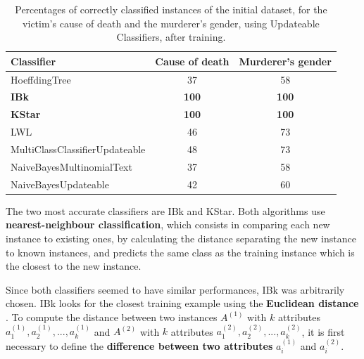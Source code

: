 \documentclass{mproj}
\begin{document}
\begin{table}[h]
	\centering
	\caption{Percentages of correctly classified instances of the initial dataset, for the victim's cause of death and the murderer's gender, using Updateable Classifiers, after training.}
	\begin{tabular}{ |l|c|c| }
		\hline
		\textbf{Classifier}            & \textbf{Cause of death} 					 & \textbf{Murderer's gender} 					  \\
		\hline		
		HoeffdingTree                  & 37                                          & 58                                             \\
		\textbf{IBk}                   & \textbf{100}                                & \textbf{100}                                   \\
		\textbf{KStar}                 & \textbf{100}                                & \textbf{100}                                   \\
		LWL                            & 46                                          & 73                                             \\
		MultiClassClassifierUpdateable & 48                                          & 73                                             \\
		NaiveBayesMultinomialText      & 37                                          & 58                                             \\
		NaiveBayesUpdateable           & 42                                          & 60                                             \\
		\hline
	\end{tabular}
	\label{tab:updateable}
\end{table}

The two most accurate classifiers are IBk and KStar. Both algorithms use \textbf{nearest-neighbour classification}, which consists in comparing each new instance to existing ones, by calculating the distance separating the new instance to known instances, and predicts the same class as the training instance which is the closest to the new instance. \cite[Chapter~3]{wekabook} \par 

Since both classifiers seemed to have similar performances, IBk was arbitrarily chosen. IBk looks for the closest training example using the \textbf{Euclidean distance} \cite[Chapter~11]{wekabook}. To compute the distance between two instances $A^{(1)}$ with $k$ attributes $a_1^{(1)}, a_2^{(1)}, ..., a_k^{(1)}$ and $A^{(2)}$ with $k$ attributes $a_1^{(2)}, a_2^{(2)}, ..., a_k^{(2)}$, it is first necessary to define the \textbf{difference between two attributes} $a_i^{(1)}$ and $a_i^{(2)}$. \cite[Chapter~4]{wekabook}
\end{document}
